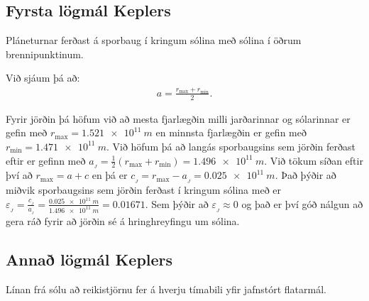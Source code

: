 \ifdefined \wholebook \else\documentclass[oneside]{book}\usepackage{EdlBook}\graphicspath{{figures/}}
\begin{document}
\subsection*{Fyrsta lögmál Keplers}

\begin{tcolorbox}
\begin{theorem}
Pláneturnar ferðast á sporbaug í kringum sólina með sólina í öðrum brennipunktinum.
\end{theorem}
\end{tcolorbox}

Við sjáum þá að:
\begin{align*}
    a = \frac{r_{\text{max}}+ r_{\text{min}}}{2}.
\end{align*}


Fyrir jörðin þá höfum við að mesta fjarlægðin milli jarðarinnar og sólarinnar er gefin með $r_{\text{max}} = \SI{1.521e11}{m}$ en minnsta fjarlægðin er gefin með $r_{\text{min}} = \SI{1.471e11}{m}$. Við höfum þá að langás sporbaugsins sem jörðin ferðast eftir er gefinn með $a_{_{J}} = \frac{1}{2}(r_{\text{max}} + r_{\text{min}}) = \SI{1.496e11}{m}$. Við tökum síðan eftir því að $r_{\text{max}} = a + c$ en þá er $c_{_{J}} = r_{\text{max}} - a_{_{J}} = \SI{0.025e11}{m}$. Það þýðir að miðvik sporbaugsins sem jörðin ferðast í kringum sólina með er $\varepsilon_{_{J}} = \frac{c_{_{J}}}{a_{_{J}}} = \frac{\SI{0.025e11}{m}}{\SI{1.496e11}{m}} = 0.01671$.
Sem þýðir að $\varepsilon_{_J} \approx 0$ og það er því góð nálgun að gera ráð fyrir að jörðin sé á hringhreyfingu um sólina.

\subsection*{Annað lögmál Keplers}

\begin{tcolorbox}
\begin{theorem}
Línan frá sólu að reikistjörnu fer á hverju tímabili yfir jafnstórt flatarmál.
\end{theorem}
\end{tcolorbox}
\end{document}
